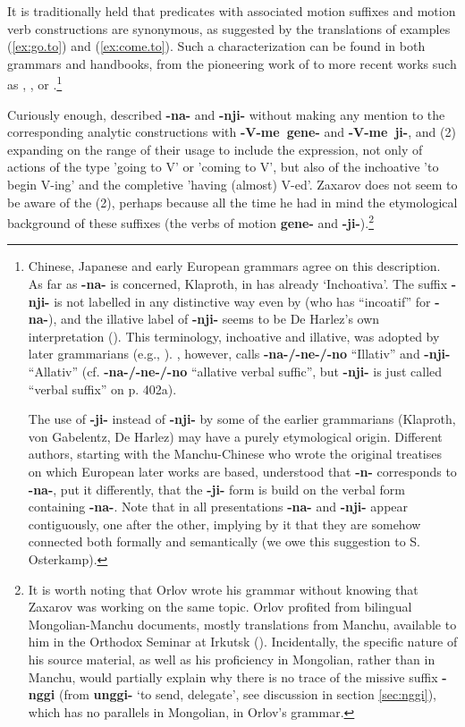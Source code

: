 \documentclass{article}
\newcommand{\ipa}[1]{\textbf{{\phon\mbox{#1}}}} %
\begin{document}
It is traditionally held that predicates with associated motion suffixes and motion verb constructions are synonymous, as suggested by the translations of examples (\ref{ex:go.to}) and (\ref{ex:come.to}). Such a characterization can be found in both grammars and handbooks, from the pioneering work of \citet[163-165 §§133-134]{zaxarov10manchu} to more recent works such as \citet[34-35]{pashkov63manchu}, \citet[173-174]{avrorin00manchu},  \citet[19]{li00manchu} or \citet[239-240]{gorelova02manchu}.\footnote{Chinese, Japanese and early European grammars agree on this description. As far as \ipa{-na-} is concerned, Klaproth, in \citet[206]{adelung1817mithr} has already `Inchoativa'. The suffix \ipa{-nji-} is not labelled in any distinctive way even by \citet[51]{gabelentz32mandchou} (who has “incoatif” for \ipa{-na-}), and the illative label of \ipa{-nji-} seems to be De Harlez’s own interpretation (\citealt[51]{harlez84mandchou}). This terminology, inchoative and illative, was adopted by later grammarians  (e.g., \citet[367]{peeters40manjurische}). \citet[53]{haenisch61mandschu}, however, calls \ipa{-na-/-ne-/-no} “Illativ” and \ipa{-nji-} “Allativ” (cf. \citet[401b]{li00manchu} \ipa{-na-/-ne-/-no} “allative verbal suffic”, but \ipa{-nji-} is just called “verbal suffix” on p. 402a).

The use of \ipa{-ji-} instead of \ipa{-nji-} by some of the earlier grammarians (Klaproth, von Gabelentz, De Harlez) may have a purely etymological origin. Different authors, starting with the Manchu-Chinese who wrote the original treatises on which European later works are based, understood that \ipa{-n-} corresponds to \ipa{-na-}, put it differently, that the \ipa{-ji-} form is build on the verbal form containing \ipa{-na-}. Note that in all presentations \ipa{-na-} and \ipa{-nji-} appear contiguously, one after the other, implying by it that they are somehow connected both formally and semantically (we owe this suggestion to S. Osterkamp).}

Curiously enough, \citet{orlov1873manchu} described \ipa{-na-} and \ipa{-nji-} without making any mention to the corresponding analytic constructions with \ipa{-V-me gene-} and \ipa{-V-me ji-}, and (2) expanding on the range of their usage to include the expression, not only of actions of the type 'going to V' or 'coming to V', but also of the inchoative 'to begin V-ing' and the completive 'having (almost) V-ed'. Zaxarov does not seem to be aware of the (2), perhaps because all the time he had in mind the etymological background of these suffixes (the verbs of motion  \ipa{gene-} and \ipa{-ji-}).\footnote{It is worth noting that Orlov wrote his grammar without knowing that Zaxarov was working on the same topic. Orlov profited from bilingual Mongolian-Manchu documents, mostly translations from Manchu, available to him in the Orthodox Seminar at Irkutsk (\citealt[V]{orlov1873manchu}). Incidentally, the specific nature of his source material, as well as his proficiency in Mongolian, rather than in Manchu, would partially explain why there is no trace of the missive suffix \ipa{-nggi} (from \ipa{unggi-} ‘to send, delegate’, see discussion in section \ref{sec:nggi}), which has no parallels in Mongolian, in Orlov’s grammar.}
\end{document}
